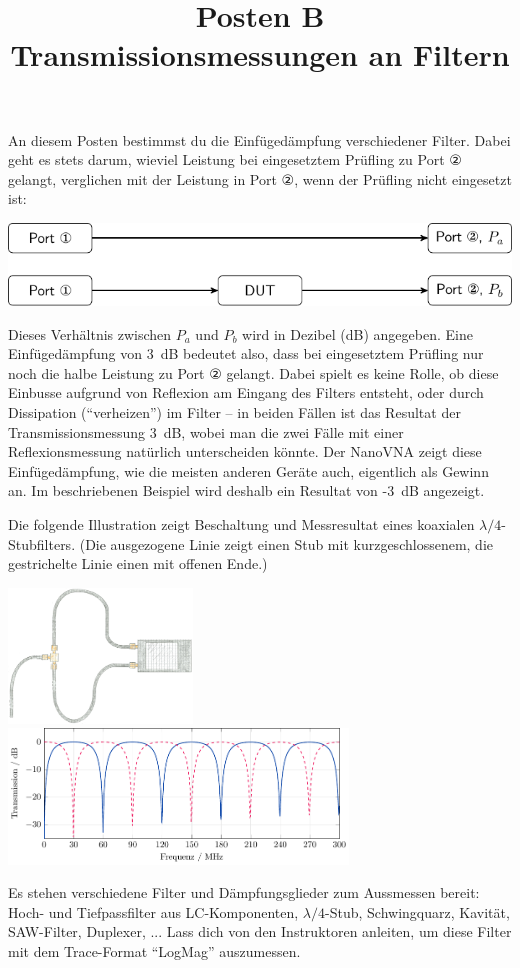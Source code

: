 \documentclass[a4paper,11pt,parskip=half,headings=small,DIV=11,notitlepage,abstract=on]{scrartcl}
\title{Posten B\\Transmissionsmessungen an Filtern}
\author{}
\date{}
\begin{document}
\maketitle
\vspace{-2cm}

An diesem Posten bestimmst du die Einfügedämpfung verschiedener Filter. Dabei
geht es stets darum, wieviel Leistung bei eingesetztem Prüfling zu Port ②
gelangt, verglichen mit der Leistung in Port ②, wenn der Prüfling nicht
eingesetzt ist:

\includegraphics[width=\textwidth]{../skript/figures/dut_insertionloss/dut_insertionloss.pdf}

Dieses Verhältnis zwischen $P_a$ und $P_b$ wird in Dezibel (dB) angegeben. Eine Einfügedämpfung von 3~dB
bedeutet also, dass bei eingesetztem Prüfling nur noch die halbe Leistung zu
Port ② gelangt. Dabei spielt es keine Rolle, ob diese Einbusse aufgrund von
Reflexion am Eingang des Filters entsteht, oder durch Dissipation
(``verheizen'') im Filter -- in beiden Fällen ist das Resultat der Transmissionsmessung
3~dB, wobei man die zwei Fälle mit einer Reflexionsmessung natürlich unterscheiden
könnte. Der NanoVNA zeigt diese Einfügedämpfung, wie die meisten anderen
Geräte auch, eigentlich als Gewinn an. Im beschriebenen Beispiel wird deshalb
ein Resultat von -3~dB angezeigt.

Die folgende Illustration zeigt Beschaltung und Messresultat eines koaxialen
$\lambda/4$-Stubfilters. (Die ausgezogene Linie zeigt einen Stub mit
kurzgeschlossenem, die gestrichelte Linie einen mit offenen Ende.)

\vspace{5mm}
\includegraphics[height=3.6cm]{../skript/figures/illustration_stub.jpg}\hfill
\includegraphics[height=3.6cm]{../skript/figures/stub/stub.pdf}

Es stehen verschiedene Filter und Dämpfungsglieder zum Aussmessen bereit: Hoch- und
Tiefpassfilter aus LC-Komponenten, $\lambda/4$-Stub, Schwingquarz, Kavität, SAW-Filter,
Duplexer, ... Lass dich von den Instruktoren anleiten, um diese Filter mit dem
Trace-Format ``LogMag'' auszumessen.
\end{document}
